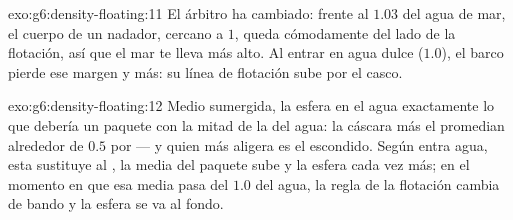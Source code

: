\begin{solution}{exo:g6:density-floating:11}
El árbitro ha cambiado: frente al $1.03$ del agua de mar, el cuerpo de
un nadador, cercano a $1$, queda cómodamente del lado de la flotación,
así que el mar te lleva más alto. Al entrar en agua dulce ($1.0$), el
barco pierde ese margen y  más: su línea de flotación sube por
el casco.
\end{solution}

\begin{solution}{exo:g6:density-floating:12}
Medio sumergida, la esfera  en el agua exactamente lo que
debería  un paquete con la mitad de la  del agua:
la cáscara más el  promedian alrededor de $0.5$  por
 --- y quien más aligera es el  escondido.
Según entra agua, esta sustituye al , la  media del
paquete sube y la esfera  cada vez más; en el momento en que
esa media pasa del $1.0$ del agua, la regla de la flotación
cambia de bando y la esfera se va al fondo.
\end{solution}

